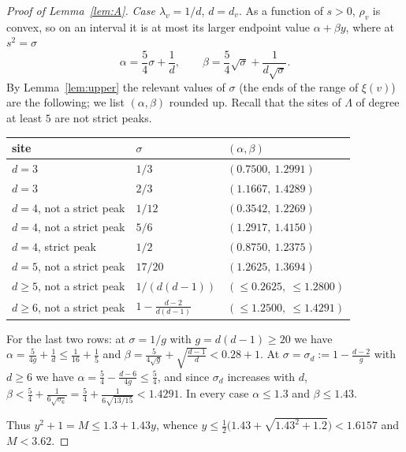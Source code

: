 \documentclass[11pt,a4paper]{article}
\theoremstyle{definition}
\theoremstyle{remark}
\numberwithin{equation}{section}
\begin{document}
\begin{proof}[Proof of Lemma~\ref{lem:A}]
\emph{Case $\lambda_v=1/d$}, $d=d_v$. As a function of $s>0$, $\rho_v$ is convex,
so on an interval it is at most its larger endpoint value
$\alpha+\beta y$, where at $s^2=\sigma$
\[
 \alpha=\frac54\sigma+\frac1d,\qquad \beta=\frac54\sqrt\sigma+\frac1{d\sqrt\sigma}.
\]
By Lemma~\ref{lem:upper} the relevant values of $\sigma$ (the ends of the range of
$\xi(v)$) are the following; we list $(\alpha,\beta)$ rounded up. Recall that the
sites of $\Lambda$ of degree at least $5$ are not strict peaks.
\begin{center}\small
\begin{tabular}{lll}
\toprule
site & $\sigma$ & $(\alpha,\beta)$\\
\midrule
$d=3$ & $1/3$ & $(0.7500,\ 1.2991)$\\
$d=3$ & $2/3$ & $(1.1667,\ 1.4289)$\\
$d=4$, not a strict peak & $1/12$ & $(0.3542,\ 1.2269)$\\
$d=4$, not a strict peak & $5/6$ & $(1.2917,\ 1.4150)$\\
$d=4$, strict peak & $1/2$ & $(0.8750,\ 1.2375)$\\
$d=5$, not a strict peak & $17/20$ & $(1.2625,\ 1.3694)$\\
$d\ge5$, not a strict peak & $1/(d(d-1))$ & $(\le0.2625,\ \le1.2800)$\\
$d\ge6$, not a strict peak & $1-\frac{d-2}{d(d-1)}$ & $(\le1.2500,\ \le1.4291)$\\
\bottomrule
\end{tabular}
\end{center}
For the last two rows: at $\sigma=1/g$ with $g=d(d-1)\ge20$ we have
$\alpha=\frac5{4g}+\frac1d\le\frac1{16}+\frac15$ and
$\beta=\frac5{4\sqrt g}+\sqrt{\frac{d-1}d}<0.28+1$. At
$\sigma=\sigma_d:=1-\frac{d-2}{g}$ with $d\ge6$ we have
$\alpha=\frac54-\frac{d-6}{4g}\le\frac54$, and since $\sigma_d$ increases with $d$,
$\beta<\frac54+\frac1{6\sqrt{\sigma_6}}=\frac54+\frac1{6\sqrt{13/15}}<1.4291$.
In every case $\alpha\le1.3$ and $\beta\le1.43$.

Thus $y^2+1=M\le1.3+1.43y$, whence
$y\le\frac12\bigl(1.43+\sqrt{1.43^2+1.2}\bigr)<1.6157$ and $M<3.62$.
\end{proof}
\end{document}
